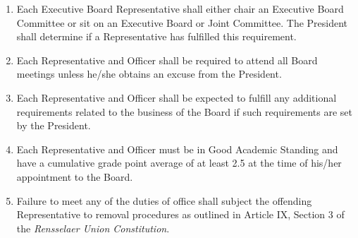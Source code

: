 
\begin{enumerate}

    \item Each Executive Board Representative shall either chair an Executive Board Committee or sit on an Executive Board or Joint Committee. The President shall determine if a Representative has fulfilled this requirement.

    \item Each Representative and Officer shall be required to attend all Board meetings unless he/she obtains an excuse from the President.
    
    \item Each Representative and Officer shall be expected to fulfill any additional requirements related to the business of the Board if such requirements are set by the President.

    \item Each Representative and Officer must be in Good Academic Standing and have a cumulative grade point average of at least 2.5 at the time of his/her appointment to the Board.

    \item Failure to meet any of the duties of office shall subject the offending Representative to removal procedures as outlined in Article IX, Section 3 of the \textit{Rensselaer Union Constitution}.

\end{enumerate}
